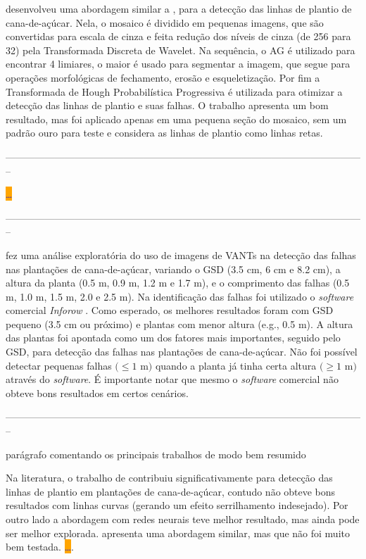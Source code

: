 \documentclass[12pt, a4paper, english, brazil]{article}
\newcommand{\textRed}[1]{{{\color{red} #1}}}
\newcommand{\dotsBlue}{\colorbox{orange}{\textcolor{blue}{\dots}}}
\newcommand{\linePage}{--------------------------------------------------------------------------------------------------------------}
\begin{document}
 desenvolveu uma abordagem similar a , para a detecção das linhas de plantio de cana-de-açúcar. Nela, o mosaico é dividido em pequenas imagens, que são convertidas para escala de cinza e feita redução dos níveis de cinza (de 256 para 32) pela Transformada Discreta de Wavelet. Na sequência, o AG é utilizado para encontrar 4 limiares, o maior é usado para segmentar a imagem, que segue para operações morfológicas de fechamento, erosão e esqueletização. Por fim a Transformada de Hough Probabilística Progressiva é utilizada para otimizar a detecção das linhas de plantio e suas falhas. O trabalho apresenta um bom resultado, mas foi aplicado apenas em uma pequena seção do mosaico, sem um padrão ouro para teste e considera as linhas de plantio como linhas retas.

\linePage

 \dotsBlue

\linePage

 fez uma análise exploratória do uso de imagens de VANTs na detecção das falhas nas plantações de cana-de-açúcar, variando o GSD (3.5 cm, 6 cm e 8.2 cm), a altura da planta (0.5 m, 0.9 m, 1.2 m e 1.7 m), e o comprimento das falhas (0.5 m, 1.0 m, 1.5 m, 2.0 e 2.5 m). Na identificação das falhas foi utilizado o \textit{software} comercial \textit{Inforow} \cite{Inforow_2021}. Como esperado, os melhores resultados foram com GSD pequeno (3.5 cm ou próximo) e plantas com menor altura (e.g., 0.5 m). A altura das plantas foi apontada como um dos fatores mais importantes, seguido pelo GSD, para detecção das falhas nas plantações de cana-de-açúcar. Não foi possível detectar pequenas falhas $(\le 1$ m$)$ quando a planta já tinha certa altura $(\ge 1$ m$)$ através do \textit{software}. É importante notar que mesmo o \textit{software} comercial não obteve bons resultados em certos cenários.

\linePage

\textRed{parágrafo comentando os principais trabalhos de modo bem resumido}

Na literatura, o trabalho de  contribuiu significativamente para detecção das linhas de plantio em plantações de cana-de-açúcar, contudo não obteve bons resultados com linhas curvas (gerando um efeito serrilhamento indesejado). Por outro lado a abordagem com redes neurais teve melhor resultado, mas ainda pode ser melhor explorada.  apresenta uma abordagem similar, mas que não foi muito bem testada.  \dotsBlue.
\end{document}
